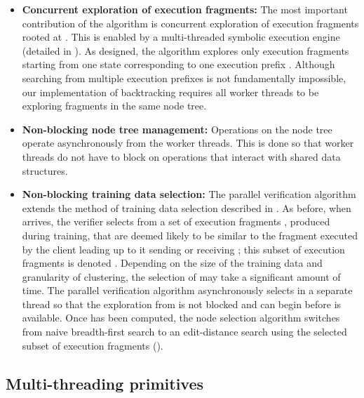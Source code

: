 \begin{itemize}

\item {\bf Concurrent exploration of execution fragments:}
The most important contribution of the algorithm is concurrent
exploration of execution fragments rooted at . This
is enabled by a multi-threaded symbolic execution engine (detailed in
). As designed, the algorithm explores only
execution fragments starting from one state 
corresponding to one execution prefix .
Although searching from multiple execution prefixes is not
fundamentally impossible, our implementation of backtracking requires
all worker threads to be exploring fragments in the same node tree.

\item {\bf Non-blocking node tree management:} 
Operations on the node tree operate asynchronously from the worker
threads. This is done so that worker threads do not have to block on
operations that interact with shared data structures. 

\item {\bf Non-blocking training data selection:} 
The parallel verification algorithm extends the method of training
data selection described in . As before, when
\msg{\msgNmbr} arrives, the verifier selects from a set of execution
fragments \trainingFrags{}, produced during training, that are deemed
likely to be similar to the fragment executed by the client leading up
to it sending or receiving \msg{\msgNmbr}; this subset of execution
fragments is denoted \trainingFrags{\msgNmbr}. Depending on the
size of the training data and granularity of clustering, the selection
of \trainingFrags{\msgNmbr} may take a significant amount of time. The
parallel verification algorithm asynchronously selects
\trainingFrags{\msgNmbr} in a separate thread so that the exploration
from  is not blocked and can begin before
\trainingFrags{\msgNmbr} is available. Once \trainingFrags{\msgNmbr}
has been computed, the node selection algorithm switches from naive
breadth-first search to an edit-distance search using the selected
subset of execution fragments (\trainingFrags{\msgNmbr}).

 
\end{itemize}

\subsection{Multi-threading primitives}
\label{sec:par:multithreaddefinitions}

